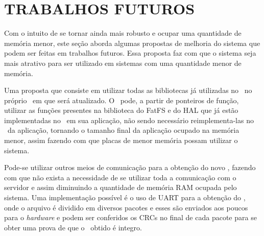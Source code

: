 \section{TRABALHOS FUTUROS}
\label{sec:trabalhosFuturos}

Com o intuito de se tornar ainda mais robusto e ocupar uma quantidade de memória menor, este seção aborda algumas propostas de melhoria do sistema que podem ser feitas em trabalhos futuros. Essa proposta faz com que o sistema seja mais atrativo para ser utilizado em sistemas com uma quantidade menor de memória.

Uma proposta que consiste em utilizar todas as bibliotecas já utilizadas no \bootloader\ no próprio \firmware\ em que será atualizado. O \firmware\ pode, a partir de ponteiros de função, utilizar as funções presentes na biblioteca do FatFS e do HAL que já estão implementadas no \bootloader\ em sua aplicação, não sendo necessário reimplementa-las no \firmware\ da aplicação, tornando o tamanho final da aplicação ocupado na memória menor, assim fazendo com que placas de menor memória possam utilizar o sistema.

Pode-se utilizar outros meios de comunicação para a obtenção do novo \firmware, fazendo com que não exista a necessidade de se utilizar toda a comunicação com o servidor e assim diminuindo a quantidade de memória RAM ocupada pelo sistema. Uma implementação possível é o uso de UART para a obtenção do \firmware, onde o arquivo é dividido em diversos pacotes e esses são enviados aos poucos para o \textit{hardware} e podem ser conferidos os CRCs no final de cada pacote para se obter uma prova de que o \firmware\ obtido é integro.


